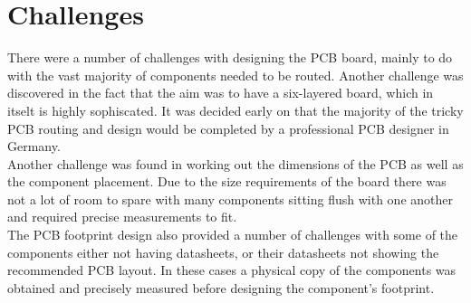 \section{Challenges}
\label{chap6sec7}

	There were a number of challenges with designing the PCB board, mainly to do with the vast majority of components needed to be routed. 
Another challenge was discovered in the fact that the aim was to have a six-layered board, which in itselt is highly sophiscated. 
It was decided early on that the majority of the tricky PCB routing and design would be completed by a professional PCB designer in Germany.\\
Another challenge was found in working out the dimensions of the PCB as well as the component placement. 
Due to the size requirements of the board there was not a lot of room to spare with many components sitting flush with one another and required precise measurements to fit. \\
The PCB footprint design also provided a number of challenges with some of the components either not having datasheets, or their datasheets not showing the recommended PCB layout. 
In these cases a physical copy of the components was obtained and precisely measured before designing the component's footprint.











